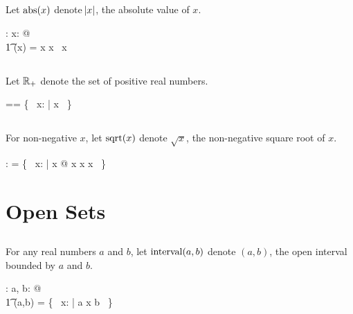 \documentclass[11pt, oneside]{article}
\begin{document}
\subsection{}

Let $\operatorname{abs}(x)$ denote $\abs{x}$, the absolute value of $x$.

\begin{axdef}
	\absR: \R \fun \R
\where
	\forall x: \R @ \\
	\t1	\absR(x) = \IF x \geR \zeroR \THEN x \ELSE \negR~x
\end{axdef}

\subsection{}

Let $\mathbb{R}_{+}$ denote the set of positive real numbers.

\begin{zed}
	\Rpos == \{~ x: \R | x \gtR \zeroR ~\}
\end{zed}

\subsection{}

For non-negative $x$, let $\operatorname{sqrt}(x)$ denote $\sqrt{x}$, the non-negative square root of $x$.

\begin{axdef}
	\sqrtR: \R \pfun \R
\where
	\sqrtR = \{~ x: \R | x \geR \zeroR @ x \mulR x \mapsto x ~\}
\end{axdef}

\section{Open Sets}

\subsection{}

For any real numbers $a$ and $b$, let $\operatorname{interval}(a,b)$ denote $(a,b)$, the open interval bounded by $a$ and $b$.

\begin{axdef}
	\intervalR: \R \cross \R \fun \power \R
\where
	\forall a, b: \R @ \\
	\t1	\intervalR(a,b) = \{~ x: \R | a \ltR x \ltR b ~\}
\end{axdef}
\end{document}
